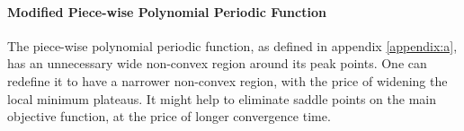 \paragraph{Modified Piece-wise Polynomial Periodic Function}
The piece-wise polynomial periodic function, as defined in appendix \ref{appendix:a}, has an unnecessary wide non-convex region around its peak points. One can redefine it to have a narrower non-convex region, with the price of widening the local minimum plateaus. It might help to eliminate saddle points on the main objective function, at the price of longer convergence time.